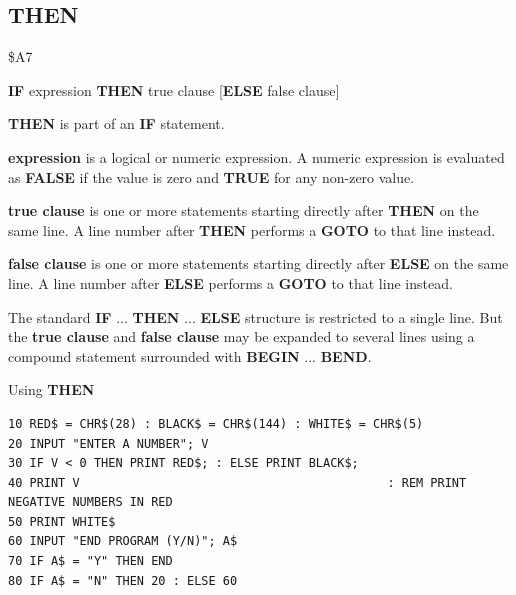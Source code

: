 \subsection{THEN}
\begin{description}[leftmargin=2cm,style=nextline]
\item [Token:]    \$A7

\item [Format:]   {\bf IF} expression {\bf THEN} true clause [{\bf ELSE} false clause]

\item [Usage:]    {\bf THEN} is part of an {\bf IF} statement.

                  {\bf expression} is a logical or numeric expression. A numeric expression is evaluated as {\bf FALSE} if the value is zero and {\bf TRUE} for any non-zero value.

                  {\bf true clause} is one or more statements starting directly after {\bf THEN} on the same line. A line number after {\bf THEN} performs a {\bf GOTO} to that line instead.

                  {\bf false clause} is one or more statements starting directly after {\bf ELSE} on the same line. A line number after {\bf ELSE} performs a {\bf GOTO} to that line instead.

\item [Remarks:]  The standard {\bf IF} ... {\bf THEN} ... {\bf ELSE} structure is restricted to a single line. But the {\bf true clause} and {\bf false clause} may be expanded to several lines using a compound statement surrounded with {\bf BEGIN} ... {\bf BEND}.

\item [Example:]  Using {\bf THEN}

\begin{tcolorbox}[colback=black,coltext=white]
\verbatimfont{\codefont}
\begin{verbatim}
10 RED$ = CHR$(28) : BLACK$ = CHR$(144) : WHITE$ = CHR$(5)
20 INPUT "ENTER A NUMBER"; V
30 IF V < 0 THEN PRINT RED$; : ELSE PRINT BLACK$;
40 PRINT V                                           : REM PRINT NEGATIVE NUMBERS IN RED
50 PRINT WHITE$
60 INPUT "END PROGRAM (Y/N)"; A$
70 IF A$ = "Y" THEN END
80 IF A$ = "N" THEN 20 : ELSE 60
\end{verbatim}
\end{tcolorbox}
\end{description}


